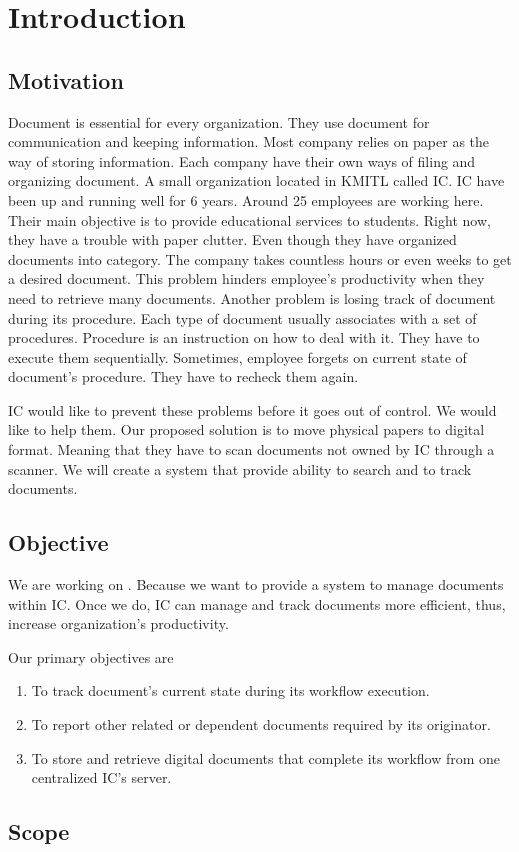 \chapter{Introduction}

\section{Motivation}
Document is essential for every organization. 
They use document for communication and keeping information.
Most company relies on paper as the way of storing information.
Each company have their own ways of filing and organizing document. 
A small organization located in KMITL called IC. 
IC have been up and running well for 6 years. Around 25 employees are working here. 
Their main objective is to provide educational services to students. 
Right now, they have a trouble with paper clutter. 
Even though they have organized documents into category. 
The company takes countless hours or even weeks to get a desired document. 
This problem hinders employee's productivity when they need to retrieve many documents. 
Another problem is losing track of document during its procedure. 
Each type of document usually associates with a set of procedures. 
Procedure is an instruction on how to deal with it. 
They have to execute them sequentially. 
Sometimes, employee forgets on current state of document's procedure. 
They have to recheck them again.

IC would like to prevent these problems before it goes out of control. 
We would like to help them. 
Our proposed solution is to move physical papers to digital format. 
Meaning that they have to scan documents not owned by IC through a scanner. 
We will create a system that provide ability to search and to track documents.

\section{Objective}
We are working on \dms.
Because we want to provide a system to manage documents within IC.
Once we do, IC can manage and track documents more efficient, thus, increase organization's productivity.

Our primary objectives are
\begin{enumerate}
\item To track document's current state during its workflow execution.
\item To report other related or dependent documents required by its originator.
\item To store and retrieve digital documents that complete its workflow from one centralized IC's server.
\end{enumerate}
\section{Scope}
